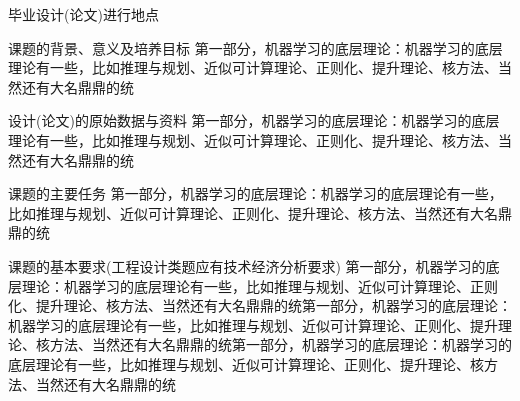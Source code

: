 \par 毕业设计(论文)进行地点\hspace{1ex}\CJKunderline{\hfill \@place \hfill}








\begin{ulfield2}[5]{课题的背景、意义及培养目标}
第一部分，机器学习的底层理论：机器学习的底层理论有一些，比如推理与规划、近似可计算理论、正则化、提升理论、核方法、当然还有大名鼎鼎的统
\end{ulfield2}

\begin{ulfield2}[6]{设计(论文)的原始数据与资料}
第一部分，机器学习的底层理论：机器学习的底层理论有一些，比如推理与规划、近似可计算理论、正则化、提升理论、核方法、当然还有大名鼎鼎的统
\end{ulfield2}

\begin{ulfield2}[7]{课题的主要任务}
第一部分，机器学习的底层理论：机器学习的底层理论有一些，比如推理与规划、近似可计算理论、正则化、提升理论、核方法、当然还有大名鼎鼎的统
\end{ulfield2}

\begin{ulfield2}[7]{课题的基本要求(工程设计类题应有技术经济分析要求)}
第一部分，机器学习的底层理论：机器学习的底层理论有一些，比如推理与规划、近似可计算理论、正则化、提升理论、核方法、当然还有大名鼎鼎的统第一部分，机器学习的底层理论：机器学习的底层理论有一些，比如推理与规划、近似可计算理论、正则化、提升理论、核方法、当然还有大名鼎鼎的统第一部分，机器学习的底层理论：机器学习的底层理论有一些，比如推理与规划、近似可计算理论、正则化、提升理论、核方法、当然还有大名鼎鼎的统
\end{ulfield2}


